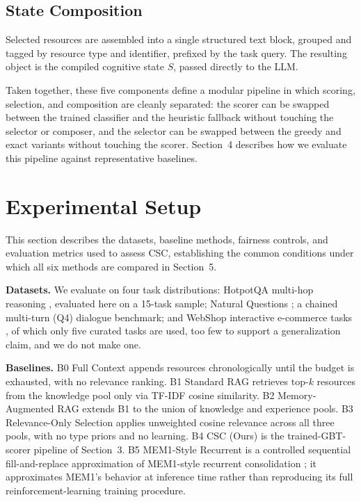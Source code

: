 \documentclass{article}
\begin{document}
\subsection{State Composition}

Selected resources are assembled into a single structured text block, grouped and tagged by resource type and identifier, prefixed by the task query. The resulting object is the compiled cognitive state $S$, passed directly to the LLM.

Taken together, these five components define a modular pipeline in which scoring, selection, and composition are cleanly separated: the scorer can be swapped between the trained classifier and the heuristic fallback without touching the selector or composer, and the selector can be swapped between the greedy and exact variants without touching the scorer. Section~4 describes how we evaluate this pipeline against representative baselines.

\section{Experimental Setup}

This section describes the datasets, baseline methods, fairness controls, and evaluation metrics used to assess CSC, establishing the common conditions under which all six methods are compared in Section~5.

\textbf{Datasets.} We evaluate on four task distributions: HotpotQA multi-hop reasoning \citep{yang2018hotpotqa}, evaluated here on a 15-task sample; Natural Questions \citep{kwiatkowski2019naturalquestions}; a chained multi-turn (Q4) dialogue benchmark; and WebShop interactive e-commerce tasks \citep{yao2022webshop}, of which only five curated tasks are used, too few to support a generalization claim, and we do not make one.

\textbf{Baselines.} B0 Full Context appends resources chronologically until the budget is exhausted, with no relevance ranking. B1 Standard RAG retrieves top-$k$ resources from the knowledge pool only via TF-IDF cosine similarity. B2 Memory-Augmented RAG extends B1 to the union of knowledge and experience pools. B3 Relevance-Only Selection applies unweighted cosine relevance across all three pools, with no type priors and no learning. B4 CSC (Ours) is the trained-GBT-scorer pipeline of Section~3. B5 MEM1-Style Recurrent is a controlled sequential fill-and-replace approximation of MEM1-style recurrent consolidation \citep{zhou2025mem1}; it approximates MEM1's behavior at inference time rather than reproducing its full reinforcement-learning training procedure.
\end{document}
